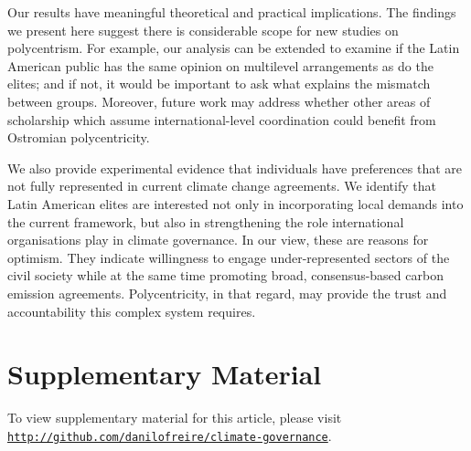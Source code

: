 \documentclass[a4paper,12pt]{article}
\begin{document}
Our results have meaningful theoretical and practical implications. The findings we present here suggest there is considerable scope for new studies on polycentrism. For example, our analysis can be extended to examine if the Latin American public has the same opinion on multilevel arrangements as do the elites; and if not, it would be important to ask what explains the mismatch between groups. Moreover, future work may address whether other areas of scholarship which assume international-level coordination could benefit from Ostromian polycentricity.   

We also provide experimental evidence that individuals have preferences that are not fully represented in current climate change agreements. We identify that Latin American elites are interested not only in incorporating local demands into the current framework, but also in strengthening the role international organisations play in climate governance. In our view, these are reasons for optimism. They indicate willingness to engage under-represented sectors of the civil society while at the same time promoting broad, consensus-based carbon emission agreements. Polycentricity, in that regard, may provide the trust and accountability this complex system requires. 

\section*{Supplementary Material}
\label{sec:supplementary}

To view supplementary material for this article, please visit \href{http://github.com/danilofreire/climate-governance}{\texttt{http://github.com/danilofreire/climate-governance}}.

\newpage



\end{document}
